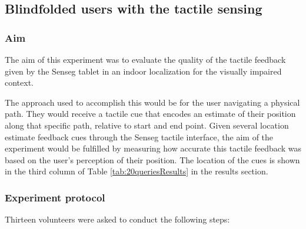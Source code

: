 
\subsection{Blindfolded users with the tactile sensing}
\subsubsection{Aim}
The aim of this experiment was to evaluate the quality of the tactile feedback given by the Senseg tablet in an indoor localization for the visually impaired context. 

The approach used to accomplish this would be for the user navigating a physical path. They would receive a tactile cue that encodes an estimate of their position along that specific path, relative to start and end point. Given several location estimate feedback cues through the Senseg tactile interface, the aim of the experiment would be fulfilled by measuring how accurate this tactile feedback was based on the user's perception of their position. The location of the cues is shown in the third column of Table \ref{tab:20queriesResults} in the results section.

\subsubsection{Experiment protocol}
Thirteen volunteers were asked to conduct the following steps:


